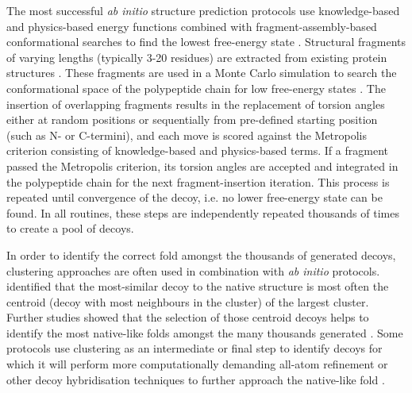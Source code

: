 The most successful \textit{ab initio} structure prediction protocols use knowledge-based and physics-based energy functions combined with fragment-assembly-based conformational searches to find the lowest free-energy state \cite{Rohl2004-dj,Xu2012-jf,Blaszczyk2013-nx,Kosciolek2014-bt,De_Oliveira2017-sg}. Structural fragments of varying lengths (typically 3-20 residues) are extracted from existing protein structures \cite{Abbass2015-qk,Shen2013-wh,Li2008-xu,Kalev2011-sz,Bhattacharya2016-ix,Wang2017-ka,De_Oliveira2015-kb,Gront2011-sv}. These fragments are used in a Monte Carlo simulation to search the conformational space of the polypeptide chain for low free-energy states \cite{Metropolis1949-kp}. The insertion of overlapping fragments results in the replacement of torsion angles either at random positions or sequentially from pre-defined starting position (such as N- or C-termini), and each move is scored against the Metropolis criterion \cite{Metropolis1949-kp} consisting of knowledge-based and physics-based terms. If a fragment passed the Metropolis criterion, its torsion angles are accepted and integrated in the polypeptide chain for the next fragment-insertion iteration. This process is repeated until convergence of the decoy, i.e. no lower free-energy state can be found. In all routines, these steps are independently repeated thousands of times to create a pool of decoys. 

In order to identify the correct fold amongst the thousands of generated decoys, clustering approaches are often used in combination with \textit{ab initio} protocols. \textcite{Shortle1998-fq} identified that the most-similar decoy to the native structure is most often the centroid (decoy with most neighbours in the cluster) of the largest cluster. Further studies showed that the selection of those centroid decoys helps to identify the most native-like folds amongst the many thousands generated \cite{Zhang2004-uz,Bradley2005-lw,Oldziej2005-qp}. Some protocols use clustering as an intermediate or final step to identify decoys for which it will perform more computationally demanding all-atom refinement \cite{Bradley2005-lw} or other decoy hybridisation techniques \cite{Zhang2004-uc,Xu2012-jf,Yang2015-oc} to further approach the native-like fold \cite{Kryshtafovych2016-aq}.

